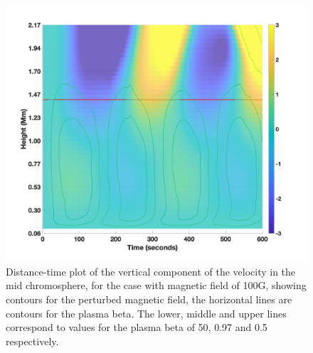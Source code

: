 \documentclass[linenumbers]{aastex63}
\begin{document}
\begin{figure}
\centering
\label{td_vert_bv100G_300_with_bandbeta}
\includegraphics[scale=0.25]{td_vert_bv100G_300_with_bandbeta.jpg}
\caption{Distance-time plot of the vertical component of the velocity in the mid chromosphere, for the case with magnetic field of 100G, showing  contours for the perturbed magnetic field, the horizontal lines are contours for the plasma beta. The lower, middle and upper lines correspond to values for the plasma beta of 50, 0.97 and 0.5 respectively.}
\end{figure}
\end{document}
